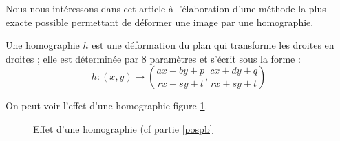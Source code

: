 


\label{pospb}
	Nous nous intéressons dans cet article à l'élaboration d'une méthode la plus exacte possible permettant de déformer une image par une homographie.
	
	\begin{Def}
 	Une homographie $h$ est une déformation du plan qui transforme les droites en droites ; elle est déterminée par 8 paramètres et s'écrit sous la forme :
	\[h : (x,y)\mapsto\left( \frac{ax+by+p}{rx+sy+t},\frac{cx+dy+q}{rx+sy+t}\right)\]
	\label{definition_homographie}
	\end{Def}
On peut voir l'effet d'une homographie figure \ref{effethom}.\\

 \begin{figure}
 
   \centering
    \arrowPDP 
   \caption{Effet d'une homographie (cf partie \ref{pospb}}
\label{effethom}
 \end{figure}


